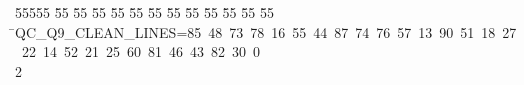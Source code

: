 %
%
\begin{tabbing}
55555 \= 55 \= 55 \= 55 \= 55 \= 55 \= 55 \= 55 \= 55 \= 55 \= 55 \= 55 \= 55 \= \>QC\_Q9\_CLEAN\_LINES=85\ 48\ 73\ 78\ 16\ 55\ 44\ 87\ 74\ 76\ 57\ 13\ 90\ 51\ 18\ 27\\[0pt]
\>\ 22\ 14\ 52\ 21\ 25\ 60\ 81\ 46\ 43\ 82\ 30\ 0\\[0pt]
2\>\end{tabbing}
